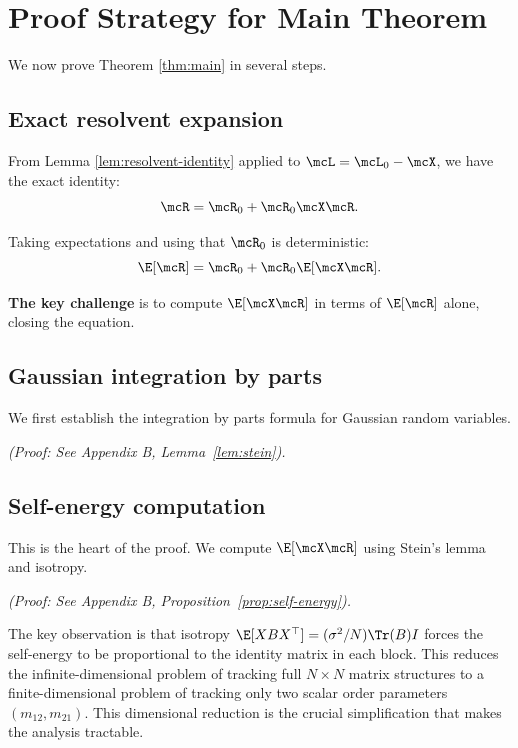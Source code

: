 
\section{Proof Strategy for Main Theorem}

We now prove Theorem \ref{thm:main} in several steps.

\subsection{Exact resolvent expansion}

From Lemma \ref{lem:resolvent-identity} applied to $\mcL = \mcL_0 - \mcX$, we have the exact identity:
\begin{equation}\label{eq:exact-expansion}
\mcR = \mcR_0 + \mcR_0 \mcX \mcR.
\end{equation}

Taking expectations and using that $\mcR_0$ is deterministic:
\begin{equation}\label{eq:expectation-expansion}
\E[\mcR] = \mcR_0 + \mcR_0 \E[\mcX \mcR].
\end{equation}

\textbf{The key challenge} is to compute $\E[\mcX \mcR]$ in terms of $\E[\mcR]$ alone, closing the equation.

\subsection{Gaussian integration by parts}

We first establish the integration by parts formula for Gaussian random variables.


\emph{(Proof: See Appendix B, Lemma~\ref{lem:stein}).}

\subsection{Self-energy computation}

This is the heart of the proof. We compute $\E[\mcX \mcR]$ using Stein's lemma and isotropy.


\emph{(Proof: See Appendix B, Proposition~\ref{prop:self-energy}).}

\begin{remark}
The key observation is that isotropy $\E[XBX^\top] = (\sigma^2/N)\Tr(B)I$ forces the self-energy to be proportional to the identity matrix in each block. This reduces the infinite-dimensional problem of tracking full $N \times N$ matrix structures to a finite-dimensional problem of tracking only two scalar order parameters $(m_{12}, m_{21})$. This dimensional reduction is the crucial simplification that makes the analysis tractable.
\end{remark}

